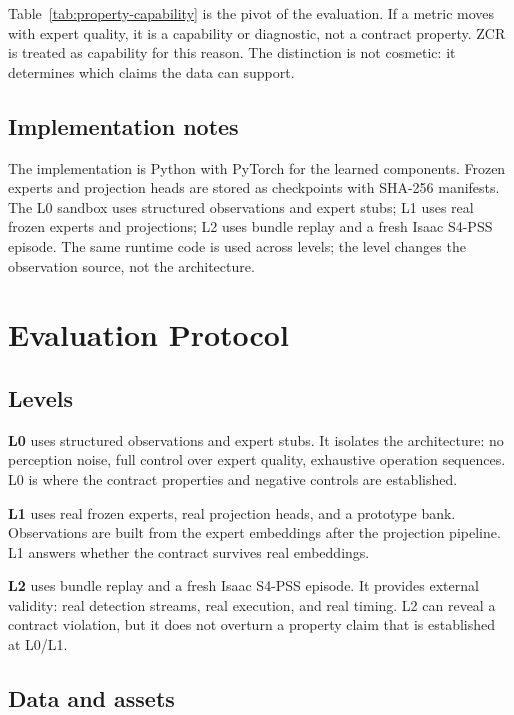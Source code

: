 \documentclass[10pt]{article}
\begin{document}
Table~\ref{tab:property-capability} is the pivot of the evaluation. If a metric
moves with expert quality, it is a capability or diagnostic, not a contract
property. ZCR is treated as capability for this reason. The distinction is not
cosmetic: it determines which claims the data can support.

\subsection{Implementation notes}

The implementation is Python with PyTorch for the learned components. Frozen
experts and projection heads are stored as checkpoints with SHA-256 manifests.
The L0 sandbox uses structured observations and expert stubs; L1 uses real
frozen experts and projections; L2 uses bundle replay and a fresh Isaac S4-PSS
episode. The same runtime code is used across levels; the level changes the
observation source, not the architecture.

\section{Evaluation Protocol}
\label{sec:evaluation}

\subsection{Levels}

\textbf{L0} uses structured observations and expert stubs. It isolates the
architecture: no perception noise, full control over expert quality, exhaustive
operation sequences. L0 is where the contract properties and negative controls
are established.

\textbf{L1} uses real frozen experts, real projection heads, and a prototype
bank. Observations are built from the expert embeddings after the projection
pipeline. L1 answers whether the contract survives real embeddings.

\textbf{L2} uses bundle replay and a fresh Isaac S4-PSS episode. It provides
external validity: real detection streams, real execution, and real timing. L2
can reveal a contract violation, but it does not overturn a property claim that
is established at L0/L1.

\subsection{Data and assets}
\end{document}
